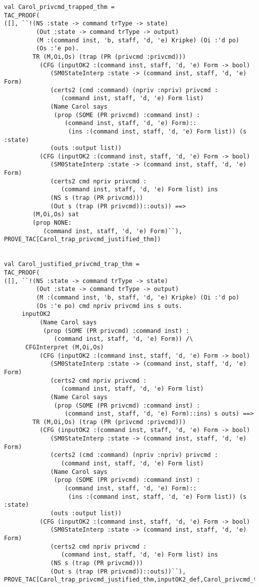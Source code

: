 \documentclass{article}
\begin{document}
\begin{verbatim}
val Carol_privcmd_trapped_thm =
TAC_PROOF(
([], ``!(NS :state -> command trType -> state)
         (Out :state -> command trType -> output)
         (M :(command inst, 'b, staff, 'd, 'e) Kripke) (Oi :'d po)
         (Os :'e po).
        TR (M,Oi,Os) (trap (PR (privcmd :privcmd)))
          (CFG (inputOK2 :(command inst, staff, 'd, 'e) Form -> bool)
             (SM0StateInterp :state -> (command inst, staff, 'd, 'e) Form)
             (certs2 (cmd :command) (npriv :npriv) privcmd :
                (command inst, staff, 'd, 'e) Form list)
             (Name Carol says
              (prop (SOME (PR privcmd) :command inst) :
                 (command inst, staff, 'd, 'e) Form)::
                  (ins :(command inst, staff, 'd, 'e) Form list)) (s :state)
             (outs :output list))
          (CFG (inputOK2 :(command inst, staff, 'd, 'e) Form -> bool)
             (SM0StateInterp :state -> (command inst, staff, 'd, 'e) Form)
             (certs2 cmd npriv privcmd :
                (command inst, staff, 'd, 'e) Form list) ins
             (NS s (trap (PR privcmd)))
             (Out s (trap (PR privcmd))::outs)) ==>
        (M,Oi,Os) sat
        (prop NONE:
           (command inst, staff, 'd, 'e) Form)``),
PROVE_TAC[Carol_trap_privcmd_justified_thm])


val Carol_justified_privcmd_trap_thm =
TAC_PROOF(
([], ``!(NS :state -> command trType -> state)
         (Out :state -> command trType -> output)
         (M :(command inst, 'b, staff, 'd, 'e) Kripke) (Oi :'d po)
         (Os :'e po) cmd npriv privcmd ins s outs.
	 inputOK2
          (Name Carol says
           (prop (SOME (PR privcmd) :command inst) :
              (command inst, staff, 'd, 'e) Form)) /\
	  CFGInterpret (M,Oi,Os)
          (CFG (inputOK2 :(command inst, staff, 'd, 'e) Form -> bool)
             (SM0StateInterp :state -> (command inst, staff, 'd, 'e) Form)
             (certs2 cmd npriv privcmd :
                (command inst, staff, 'd, 'e) Form list)
             (Name Carol says
              (prop (SOME (PR privcmd) :command inst) :
                 (command inst, staff, 'd, 'e) Form)::ins) s outs) ==>
        TR (M,Oi,Os) (trap (PR (privcmd :privcmd)))
          (CFG (inputOK2 :(command inst, staff, 'd, 'e) Form -> bool)
             (SM0StateInterp :state -> (command inst, staff, 'd, 'e) Form)
             (certs2 (cmd :command) (npriv :npriv) privcmd :
                (command inst, staff, 'd, 'e) Form list)
             (Name Carol says
              (prop (SOME (PR privcmd) :command inst) :
                 (command inst, staff, 'd, 'e) Form)::
                  (ins :(command inst, staff, 'd, 'e) Form list)) (s :state)
             (outs :output list))
          (CFG (inputOK2 :(command inst, staff, 'd, 'e) Form -> bool)
             (SM0StateInterp :state -> (command inst, staff, 'd, 'e) Form)
             (certs2 cmd npriv privcmd :
                (command inst, staff, 'd, 'e) Form list) ins
             (NS s (trap (PR privcmd)))
             (Out s (trap (PR privcmd))::outs))``),
PROVE_TAC[Carol_trap_privcmd_justified_thm,inputOK2_def,Carol_privcmd_trap_lemma])


\end{verbatim}
\end{document}
